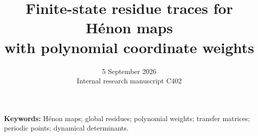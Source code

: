 \documentclass[11pt,a4paper]{article}
\title{Finite-state residue traces for H\'enon maps\\
with polynomial coordinate weights}
\author{}
\date{5 September 2026\\\small Internal research manuscript C402}
\begin{document}
\maketitle
\begin{abstract}

\end{abstract}
\medskip
\noindent\textbf{Keywords:} H\'enon maps; global residues; polynomial weights;
transfer matrices; periodic points; dynamical determinants.










\end{document}

